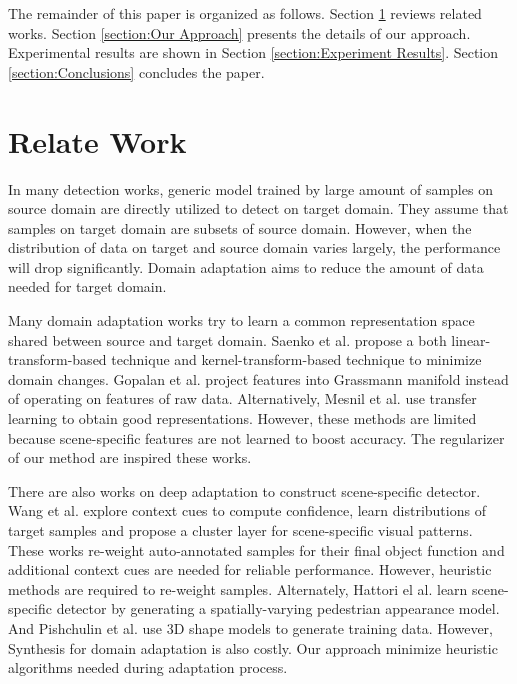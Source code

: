 \documentclass[runningheads]{llncs}
\begin{document}
The remainder of this paper is organized as follows. Section \ref{section:Relate Work} reviews related works. Section \ref{section:Our Approach} presents the details of our approach. Experimental results are shown in Section \ref{section:Experiment Results}. Section \ref{section:Conclusions} concludes the paper.

\section{Relate Work}
\label{section:Relate Work}

In many detection works, generic model trained by large amount of samples on source domain are directly utilized to detect on target domain. They assume that samples on target domain are subsets of source domain. However, when the distribution of data on target and source domain varies largely, the performance will drop significantly. Domain adaptation aims to reduce the amount of data needed for target domain.

Many domain adaptation works try to learn a common representation space shared between source and target domain. Saenko et al. \cite{saenko2010adapting,kulis2011you} propose a both linear-transform-based technique and kernel-transform-based technique to minimize domain changes. Gopalan et al. \cite{gopalan2011domain} project features into Grassmann manifold instead of operating on features of raw data. Alternatively, Mesnil et al. \cite{mesnil2012unsupervised} use transfer learning to obtain good representations. However, these methods are limited because scene-specific features are not learned to boost accuracy. The regularizer of our method are inspired these works.

There are also works on deep adaptation to construct scene-specific detector. Wang et al.\cite{wang2014scene} explore context cues to compute confidence, \cite{zeng2014deep} learn distributions of target samples and propose a cluster layer for scene-specific visual patterns. These works re-weight auto-annotated samples for their final object function and additional context cues are needed for reliable performance. However, heuristic methods are required to re-weight samples. Alternately, Hattori el al. \cite{hattori2015learning} learn scene-specific detector by generating a spatially-varying pedestrian appearance model. And Pishchulin et al. \cite{pishchulin2011learning} use 3D shape models to generate training data. However, Synthesis for domain adaptation is also costly. Our approach minimize heuristic algorithms needed during adaptation process.
\end{document}
